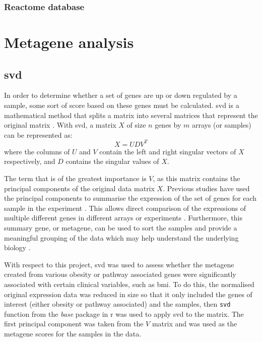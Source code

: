 \subsubsection{Reactome database}
\label{ssub:Reactome_database}



\section{Metagene analysis}
\label{sec:metagene_analysis}

\subsection{\Gls{svd}}
\label{sub:svd}

In order to determine whether a set of genes are up or down regulated by a sample, some sort of score based on these genes must be calculated.
\Gls{svd} is a mathematical method that splits a matrix into several matrices that represent the original matrix \citep{Golub1970}.
With \gls{svd}, a matrix $X$ of size $n$ genes by $m$ arrays (or samples) can be represented as:
\begin{equation}
	\label{eq:svd}
	X = UDV^T
\end{equation}
where the columns of $U$ and $V$ contain the left and right singular vectors of $X$ respectively, and $D$ contains the singular values of $X$.

The term that is of the greatest importance is $V$, as this matrix contains the principal components of the original data matrix $X$.
Previous studies have used the principal components to summarise the expression of the set of genes for each sample in the experiment \citep{Alter2000,West2001}.
This allows direct comparison of the expressions of multiple different genes in different arrays or experiments \citep{Alter2000}.
Furthermore, this summary gene, or metagene, can be used to sort the samples and provide a meaningful grouping of the data which may help understand the underlying biology \citep{Alter2000}.

With respect to this project, \gls{svd} was used to assess whether the metagene created from various obesity or pathway associated genes were significantly associated with certain clinical variables, such as \gls{bmi}.
To do this, the normalised original expression data was reduced in size so that it only included the genes of interest (either obesity or pathway associated) and the samples, then \texttt{svd} function from the \textit{base} package in \gls{r} was used to apply \gls{svd} to the matrix.
The first principal component was taken from the $V$ matrix and was used as the metagene scores for the samples in the data.

